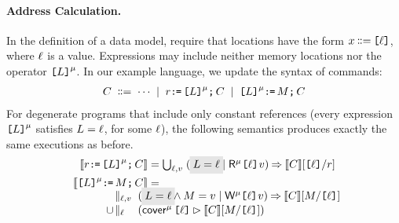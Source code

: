 \paragraph{Address Calculation.}
In the definition of a data model, require
that locations have the form $x\!\!\;\mathrel{\mathord{\vcentcolon}\mkern-1mu\mathord{\vcentcolon}\mathord{{=}}}\;\!\!\texttt{[}\ell\texttt{]}$, where $\ell$
is a value.  Expressions may include neither memory locations nor the
operator $\texttt{[}L\texttt{]}^{\mu}$.
In our example language, we update the syntax of commands:
\begin{gather*}
  C
  \;\mathrel{\mathord{\vcentcolon}\mkern-1mu\mathord{\vcentcolon}\mathord{{=}}}\; \cdots
  \;\mathrel{|}\; r\texttt{:}\mkern-1mu\texttt{=}\,\texttt{[}L\texttt{]}^{\mu}\texttt{;}\,\allowbreak C 
  \;\mathrel{|}\; \texttt{[}L\texttt{]}^{\mu}\texttt{:}\mkern-1mu\texttt{=}\,M\texttt{;}\,\allowbreak C
\end{gather*}
For degenerate programs that include only constant references (every
expression $\texttt{[}L\texttt{]}^\mu$ satisfies $L=\ell$, for some $\ell$), the
following semantics produces exactly the same executions as before.
\begin{align*}
  \sem{\aReg\GETS\REF{\cExp}^\amode\SEMI \aCmd} & =
  \textstyle\bigcup_{\cVal,\aVal}\; (\;\mathhl{\cExp=\cVal} \mid \DRmode{\REF{\cVal}}\aVal) \prefix \sem{\aCmd}[\REF{\cVal}/\aReg]  
  \\
  \sem{\REF{\cExp}^\amode\GETS\aExp\SEMI \aCmd} & =
  \\[-1ex]
  &\mkern-68mu\hbox to 0pt{$\begin{aligned}
    &\textstyle\parallel_{\cVal,\aVal}\;(\;\mathhl{\cExp=\cVal} \land \aExp=\aVal \mid \DWmode{\REF{\cVal}}\aVal) \prefix \sem{\aCmd}[\aExp/\REF{\cVal}]
    \\[-.5ex]  \cup\!&
    \textstyle\parallel_{\cVal\phantom{,\aVal}}\; %
    (\relfilt{\REF{\cVal}} \sem{\aCmd}[\aExp/\REF{\cVal}])    
  \end{aligned}$}
\end{align*}

